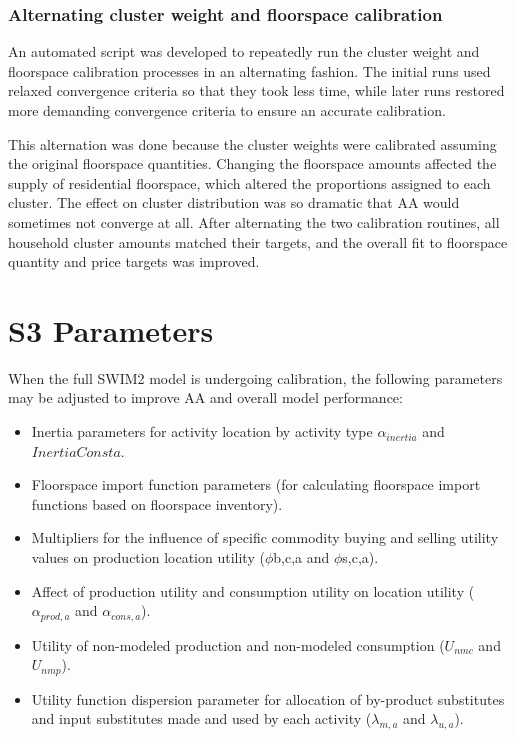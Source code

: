 \subsubsection{Alternating cluster weight and floorspace calibration}
An automated script was developed to repeatedly run the cluster weight and floorspace calibration processes in an alternating fashion. The initial runs used relaxed convergence criteria so that they took less time, while later runs restored more demanding convergence criteria to ensure an accurate calibration.

This alternation was done because the cluster weights were calibrated assuming the original floorspace quantities. Changing the floorspace amounts affected the supply of residential floorspace, which altered the proportions assigned to each cluster. The effect on cluster distribution was so dramatic that AA would sometimes not converge at all. After alternating the two calibration routines, all household cluster amounts matched their targets, and the overall fit to floorspace quantity and price targets was improved.

\section{S3 Parameters}
When the full SWIM2 model is undergoing calibration, the following parameters may be adjusted to improve AA and overall model performance:
\begin{itemize}
\item Inertia parameters for activity location by activity type $\alpha_{inertia}$ and $InertiaConsta$.
\item Floorspace import function parameters (for calculating floorspace import functions based on floorspace inventory).
\item Multipliers for the influence of specific commodity buying and selling utility values on production location utility ($\phi$b,c,a and $\phi$s,c,a).
\item Affect of production utility and consumption utility on location utility ($\alpha_{prod,a}$ and 
$\alpha_{cons,a}$).
\item Utility of non-modeled production and non-modeled consumption ($U_{nmc}$ and $U_{nmp}$).
\item Utility function dispersion parameter for allocation of by-product substitutes and input substitutes made and used by each activity ($\lambda_{m,a}$ and $\lambda_{u,a}$).
\end{itemize}
